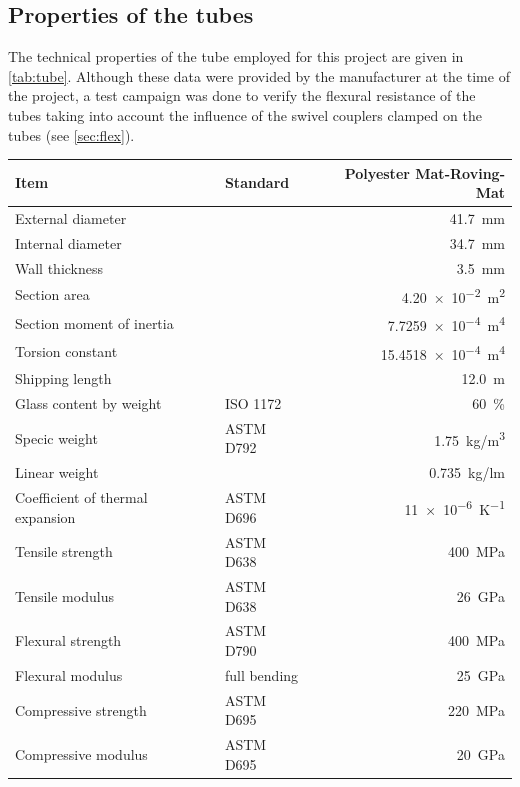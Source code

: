 \subsection{Properties of the tubes}\label{sec:gfrp}
The technical properties of the tube employed for this project are given in \cref{tab:tube}. Although these data were provided by the manufacturer at the time of the project, a test campaign was done to verify the flexural resistance of the tubes taking into account the influence of the swivel couplers clamped on the tubes (see \cref{sec:flex}).
\begin{table}[p]
\begin{fullpage}
\centering
 	\begin{tabular}{@{}l l r @{}}
	\toprule
	Item 							& Standard	 	& Polyester Mat-Roving-Mat \\
	\midrule
	External diameter 				&				& \SI{41.7}{\mm} \\
	Internal diameter 				& 				& \SI{34.7}{\mm} \\
	Wall thickness					& 				& \SI{3.5}{\mm} \\
	Section area					& 				& \SI{4.20e-2}{m^2} \\
	Section moment of inertia			&				& \SI{7.7259e-4}{m^4} \\
	Torsion constant				&				& \SI{15.4518e-4}{m^4} \\
	\midrule
	Shipping length 				& 				& \SI{12.0}{\m} \\
	Glass content by weight 			& ISO 1172		& \SI{60}{\percent}\\
	Specic weight					& ASTM D792		& \SI{1.75}{\kg/m^3}\\
	Linear weight					& 				& \SI{0.735}{\kg/lm}\\
	Coefficient of thermal expansion	& ASTM D696		& \SI{11e-6}{K^{-1}}\\
	\midrule
	Tensile strength					& ASTM D638		& \SI{400}{MPa}\\
	Tensile modulus				& ASTM D638		& \SI{26}{GPa}\\
	Flexural strength				& ASTM D790		& \SI{400}{MPa}\\
	Flexural modulus				& full bending		& \SI{25}{GPa}\\
	Compressive strength			& ASTM D695		& \SI{220}{MPa}\\
	Compressive modulus			& ASTM D695		& \SI{20}{GPa}\\

\end{tabular}
\end{fullpage}
\end{table}
